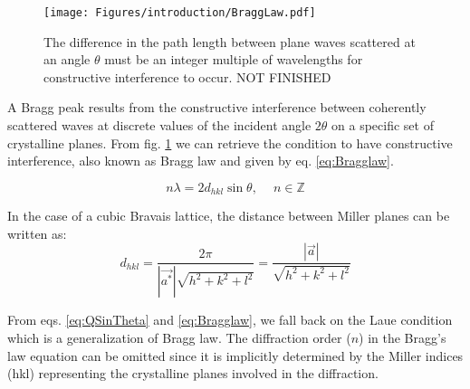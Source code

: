 \begin{figure}[!htb]
    \centering
    \texttt{[image: Figures/introduction/BraggLaw.pdf]}
    \caption{The difference in the path length between plane waves scattered at an angle $\theta$ must be an integer multiple of wavelengths for constructive interference to occur. NOT FINISHED}
    \label{fig:BraggLaw}
\end{figure}

A Bragg peak results from the constructive interference between coherently scattered waves at discrete values of the incident angle $2\theta$ on a specific set of crystalline planes.
From fig. \ref{fig:BraggLaw} we can retrieve the condition to have constructive interference, also known as Bragg law and given by eq. \eqref{eq:Bragglaw}.

\begin{equation}
    \label{eq:Bragglaw}
    n\lambda = 2d_{hkl} \sin{\theta}, \quad \ n \in \mathbb{Z}
\end{equation}


In the case of a cubic Bravais lattice, the distance between Miller planes can be written as:
\begin{equation}
    \label{eq:Interplanarspacing}
    d_{hkl}=\frac{2\pi}{|\vec{a^*}|\sqrt{h^2 + k^2 + l^2}}=\frac{|\vec{a}|}{\sqrt{h^2 + k^2 + l^2}}
\end{equation}

From eqs. \ref{eq:QSinTheta} and \ref{eq:Bragglaw}, we fall back on the Laue condition which is a generalization of Bragg law. The diffraction order ($n$) in the Bragg's law equation can be omitted since it is implicitly determined by the Miller indices (hkl) representing the crystalline planes involved in the diffraction.

